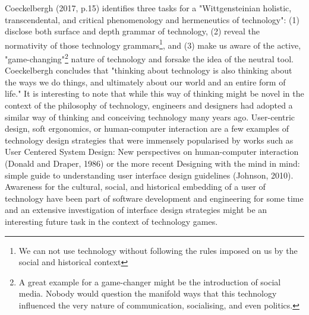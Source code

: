 Coeckelbergh (2017, p.15) identifies three tasks for a "Wittgensteinian holistic, transcendental, and critical phenomenology and hermeneutics of
technology": (1) disclose both surface and depth grammar of technology, (2) reveal the normativity of those technology
grammars\footnote{We can not use technology without following the rules imposed on us by the social and historical context}, and (3) make us
aware of the active, "game-changing"\footnote{A great example for a game-changer might be the introduction of social media. Nobody
would question the manifold ways that this technology influenced the very nature of communication, socialising, and even politics.} nature
of technology and forsake the idea of the neutral tool. Coeckelbergh concludes that "thinking about technology is also thinking about the
ways we do things, and ultimately about our world and an entire form of life." It is interesting to note that while this way of thinking might
be novel in the context of the philosophy of technology, engineers and designers had adopted a similar way of thinking and conceiving
technology many years ago. User-centric design, soft ergonomics, or human-computer interaction are a few examples of technology design
strategies that were immensely popularised by works such as User Centered System Design: New perspectives on human-computer interaction
(Donald and Draper, 1986) or the more recent Designing with the mind in mind: simple guide to understanding user interface design
guidelines (Johnson, 2010). Awareness for the cultural, social, and historical embedding of a user of technology have been part of software
development and engineering for some time and an extensive investigation of interface design strategies might be an interesting future task in
the context of technology games.